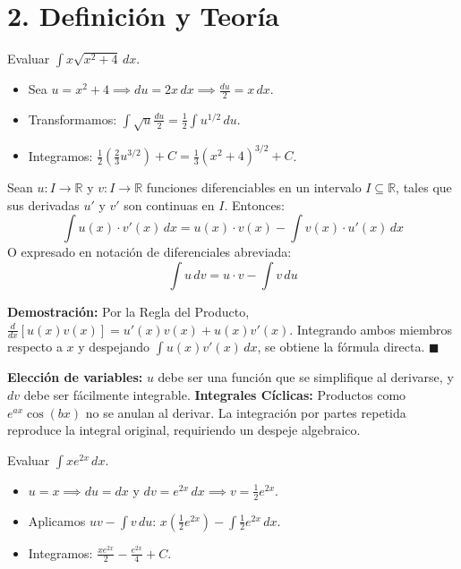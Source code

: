\documentclass[11pt]{article}
\newenvironment{teoria}{\section*{2. Definición y Teoría}}{}
\newenvironment{teorema}[1]{\begin{tcolorbox}[colback=green!5,colframe=green!75!black,title=Teorema: #1]}{\end{tcolorbox}}
\newenvironment{alerta}[1]{\begin{tcolorbox}[colback=yellow!5,colframe=yellow!75!black,title=Alerta: #1]}{\end{tcolorbox}}
\newenvironment{ejemplo}[1]{\begin{tcolorbox}[colback=gray!5,colframe=gray!60!black,title=Ejemplo Analítico: #1]}{\end{tcolorbox}}
\begin{document}
\begin{teoria}
  \begin{ejemplo}{Ajuste de Constantes Multiplicativas (Sustitución)}
    Evaluar $\displaystyle\int x \sqrt{x^2 + 4} \, dx$.
    \begin{itemize}
      \item Sea $\displaystyle u = x^2 + 4 \implies du = 2x \, dx \implies \frac{du}{2} = x \, dx$.
      \item Transformamos: $\displaystyle\int \sqrt{u} \frac{du}{2} = \frac{1}{2} \displaystyle\int u^{1/2} \, du$.
      \item Integramos: $\displaystyle \frac{1}{2} \left( \frac{2}{3} u^{3/2} \right) + C = \frac{1}{3} (x^2 + 4)^{3/2} + C$.
    \end{itemize}
  \end{ejemplo}

  \begin{teorema}{Teorema de Integración por Partes}
    Sean $u: I \to \mathbb{R}$ y $v: I \to \mathbb{R}$ funciones diferenciables en un intervalo $I \subseteq \mathbb{R}$, tales que sus derivadas $u'$ y $v'$ son continuas en $I$. Entonces:
    \[ \displaystyle\int u(x) \cdot v'(x) \, dx = u(x) \cdot v(x) - \displaystyle\int v(x) \cdot u'(x) \, dx \]
    O expresado en notación de diferenciales abreviada:
    \[ \displaystyle\int u \, dv = u \cdot v - \displaystyle\int v \, du \]
  \end{teorema}

  \textbf{Demostración:} Por la Regla del Producto, $\displaystyle \frac{d}{dx}[u(x)v(x)] = u'(x)v(x) + u(x)v'(x)$. Integrando ambos miembros respecto a $x$ y despejando $\displaystyle\int u(x)v'(x) \, dx$, se obtiene la fórmula directa. $\blacksquare$

  \begin{alerta}{Estrategia de Reducción Estructural y Ciclos}
    \textbf{Elección de variables:} $u$ debe ser una función que se simplifique al derivarse, y $dv$ debe ser fácilmente integrable. 
    \textbf{Integrales Cíclicas:} Productos como $e^{ax}\cos(bx)$ no se anulan al derivar. La integración por partes repetida reproduce la integral original, requiriendo un despeje algebraico.
  \end{alerta}

  \begin{ejemplo}{Reducción de Grado Algebraico (Por Partes)}
    Evaluar $\displaystyle\int x e^{2x} \, dx$.
    \begin{itemize}
      \item $\displaystyle u = x \implies du = dx$ \quad y \quad $\displaystyle dv = e^{2x} \, dx \implies v = \frac{1}{2} e^{2x}$.
      \item Aplicamos $uv - \displaystyle\int v \, du$: $\displaystyle x \left( \frac{1}{2} e^{2x} \right) - \displaystyle\int \frac{1}{2} e^{2x} \, dx$.
      \item Integramos: $\displaystyle \frac{x e^{2x}}{2} - \frac{e^{2x}}{4} + C$.
    \end{itemize}
  \end{ejemplo}


\end{teoria}
\end{document}
